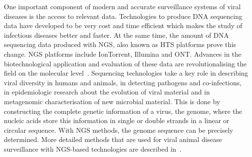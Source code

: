 One important component of modern and accurate surveillance systems of viral diseases is the access to relevant data. Technologies to produce \ac{DNA} sequencing data have developed to be very cost and time efficient which makes the study of infectious diseases better and faster. At the same time, the amount of \ac{DNA} sequencing data produced with \ac{NGS}, also known as \ac{HTS} platforms prove this change. \ac{NGS} platforms include IonTorrent, Illumina and \ac{ONT}. Advances in the biotechnological application and evaluation of these data are revolutionalising the field on the molecular level~\cite{suminda2022high}. Sequencing technologies take a key role in describing viral diversity in humans and animals, in detecting pathogens and co-infections, in epidemiologic research about the evolution of viral material and in metagenomic characterisation of new microbial material. This is done by constructing the complete genetic information of a virus, the genome, where the nucleic acids store this information in single or double strands in a linear or circular sequence. With \ac{NGS} methods, the genome sequence can be precisely determined. More detailed methods that are used for viral animal disease surveillance with \ac{NGS}-based technologies are described in~.

